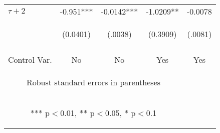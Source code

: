 \documentclass{article}
\begin{document}
\begin{table}[htbp]
\begin{tabular}{lcccc}
 $\tau + 2$ &  -0.951*** & -0.0142*** & -1.0209** & -0.0078\\
 & \begin{footnotesize}(0.0401)\end{footnotesize} & \begin{footnotesize}(.0038)\end{footnotesize} & \begin{footnotesize}(0.3909)\end{footnotesize} & \begin{footnotesize}(.0081)\end{footnotesize}\\
\vspace{4pt} & \begin{footnotesize}\end{footnotesize} & \begin{footnotesize}\end{footnotesize} & \begin{footnotesize}\end{footnotesize} & \begin{footnotesize}\end{footnotesize}\\
Control Var. & No & No & Yes & Yes \\ \hline
\multicolumn{4}{c}{\begin{footnotesize} Robust standard errors in parentheses\end{footnotesize}} \\
\multicolumn{4}{c}{\begin{footnotesize} *** p$<$0.01, ** p$<$0.05, * p$<$0.1\end{footnotesize}} \\
\end{tabular}
\end{table}
\end{document}
